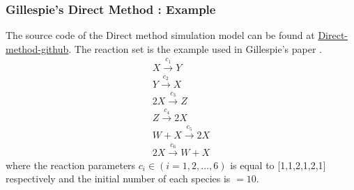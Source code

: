 \documentclass[11pt,a4paper]{article}
\begin{document}
\subsubsection{Gillespie's Direct Method : Example}
The source code of the Direct method simulation model can be found at \href{https://github.com/Prateeba/TRAN-F501-Internship-201819/tree/master/Code/G_first_reaction}{Direct-method-github}. The reaction set is the example used in Gillespie's paper \cite{gillespie_general_1976}.
\begin{gather}
  {X \xrightarrow{c_{1}} Y}      \\
  {Y \xrightarrow{c_{2}} X}      \\
  {2X \xrightarrow{c_{3}} Z}     \\
  {Z \xrightarrow{c_{4}} 2X}     \\
  {W + X \xrightarrow{c_{5}} 2X} \\
  {2X \xrightarrow{c_{6}} W + X}
\end{gather}
where the reaction parameters $c_{i} \in (i = 1, 2, \dots, 6)$ is equal to [1,1,2,1,2,1] respectively and the initial number of each species is $= 10$.
\end{document}
